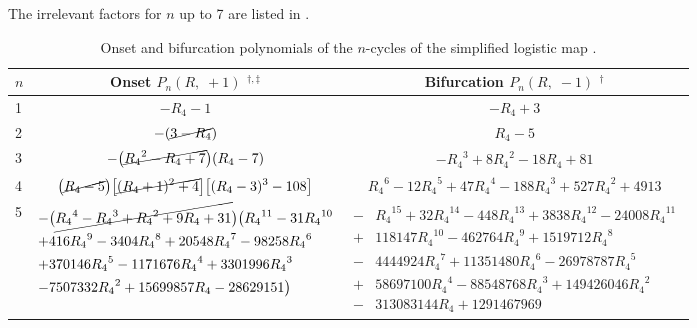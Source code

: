 \documentclass[twocolumn]{revtex4-1}
\begin{document}
The irrelevant factors for $n$ up to 7 are listed in .



\newcommand{\T}{{R_4}}

\begin{table*}[t]\footnotesize
  \caption{
  Onset and bifurcation polynomials %
  of the $n$-cycles of the simplified logistic map .}
\begin{center}
\begin{tabular}{lcc}
\hline
  $n$
& Onset $P_n(R, \; +1)$ $^{\dagger, \ddagger}$
& Bifurcation $P_n(R, \; -1)$ $^\dagger$
\\
\hline
1
&
$-\T-1$
&
$-\T+3$
\\
2
&
$-(\cancel{3-\T})$
&
$\T-5$
\\
3
&
$\begin{aligned}
-
\big( \cancel{
  \T^2-\T+7
}\big)
  (\T-7)
\end{aligned}$
&
$\begin{aligned}
 - \T^3 + 8\T^2 - 18\T + 81
\end{aligned}$
\\
4
&
$\begin{aligned}
\big( \cancel{
  \T - 5
} \big)
\big[ \cancel{
  (\T+1)^2 + 4
} \big]
\big[
  (\T-3)^3 - 108
\big]
\end{aligned}$

&

$
\T^6-12 \T^5+47 \T^4-188 \T^3+527 \T^2+4913
$
\\
5

&

\begin{minipage}{.48\linewidth}
$\begin{aligned}
-
&\big( \cancel{
\T^4-\T^3+\T^2+9 \T+31
} \big)
\big(
\T^{11}-31 \T^{10} \\
+&416 \T^9 -3404 \T^8 +20548 \T^7-98258 \T^6 \\
+&370146 \T^5 -1171676 \T^4 +3301996 \T^3\\
-&7507332 \T^2+15699857 \T-28629151
\big)
\end{aligned}$
\end{minipage}

&

\begin{minipage}{.49\linewidth}
\vspace{1mm}
$\begin{aligned}
-&\T^{15}+32 \T^{14}-448 \T^{13}+3838 \T^{12}-24008 \T^{11}\\
+&118147 \T^{10} -462764 \T^9+1519712 \T^8\\
-&4444924 \T^7 +11351480 \T^6 -26978787 \T^5\\
+&58697100 \T^4 -88548768 \T^3+149426046 \T^2\\
-&313083144 \T +1291467969
\end{aligned}$
\vspace{1mm}
\end{minipage}


\end{tabular}
\end{center}
\end{table*}
\end{document}
